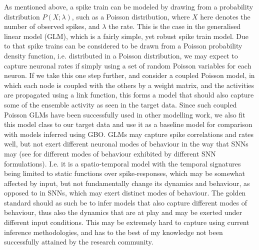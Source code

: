 \documentclass[mphil,deptreport,ianc]{infthesis} %
\begin{document}
As mentioned above, a spike train can be modeled by drawing from a probability distribution $P(X; \lambda)$, such as a Poisson distribution, where $X$ here denotes the number of observed spikes, and $\lambda$ the rate.
This is the case in the generalised linear model (GLM), which is a fairly simple, yet robust spike train model.
Due to that spike trains can be considered to be drawn from a Poisson probability density function, i.e. distributed in a Poisson distribution, we may expect to capture neuronal rates if simply using a set of random Poisson variables for each neuron.
If we take this one step further, and consider a coupled Poisson model, in which each node is coupled with the others by a weight matrix, and the activities are propagated using a link function, this forms a model that should also capture some of the ensemble activity as seen in the target data.
Since such coupled Poisson GLMs have been successfully used in other modelling work, we also fit this model class to our target data and use it as a baseline model for comparison with models inferred using GBO.
GLMs may capture spike correlations and rates well, but not exert different neuronal modes of behaviour in the way that SNNs may (see \cite{Izhikevich2004} for different modes of behaviour exhibited by different SNN formulations).
I.e. it is a spatio-temporal model with the temporal signatures being limited to static functions over spike-responses, which may be somewhat affected by input, but not fundamentally change its dynamics and behaviour, as opposed to in SNNs, which may exert distinct modes of behaviour.
The golden standard should as such be to infer models that also capture different modes of behaviour, thus also the dynamics that are at play and may be exerted under different input conditions.
This may be extremely hard to capture using current inference methodologies, and has to the best of my knowledge not been successfully attained by the research community.
\end{document}
